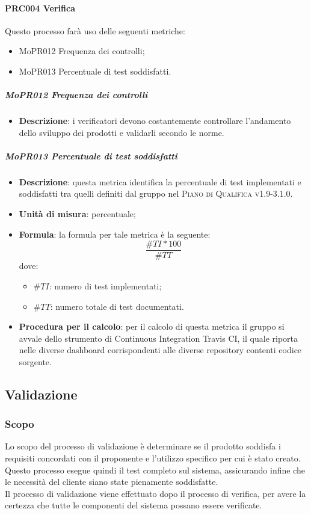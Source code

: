 \documentclass[../norme-di-progetto.tex]{subfiles}
\begin{document}
\paragraph{PRC004 Verifica}
Questo processo farà uso delle seguenti metriche:
\begin{itemize}
  \item MoPR012 Frequenza dei controlli;
  \item MoPR013 Percentuale di test soddisfatti.
\end{itemize}
\subparagraph{MoPR012 Frequenza dei controlli}
\begin{itemize}
  \item \textbf{Descrizione}: i verificatori devono costantemente controllare l'andamento dello sviluppo dei prodotti e validarli secondo le norme.
\end{itemize}

\subparagraph{MoPR013 Percentuale di test soddisfatti}
\begin{itemize}
  \item \textbf{Descrizione}: questa metrica identifica la percentuale di test implementati e soddisfatti tra quelli definiti dal gruppo nel \textsc{Piano di Qualifica v1.9-3.1.0}.
  \item \textbf{Unità di misura}: percentuale;
  \item \textbf{Formula}: la formula per tale metrica è la seguente:
  \begin{displaymath}
    \frac{\#TI * 100}{\#TT}
  \end{displaymath}
  dove:
  \begin{itemize}
    \item $ \#TI $: numero di test implementati;
    \item $ \#TT $: numero totale di test documentati.
  \end{itemize}
  \item \textbf{Procedura per il calcolo}: per il calcolo di questa metrica il gruppo si avvale dello strumento di Continuous Integration Travis CI, il quale riporta nelle diverse dashboard corrispondenti alle diverse repository contenti codice sorgente.
\end{itemize}

\subsection{Validazione}
\subsubsection{Scopo}
Lo scopo del processo di validazione è determinare se il prodotto soddisfa i requisiti concordati con il proponente e l'utilizzo specifico per cui è stato creato. Questo processo esegue quindi il test completo sul sistema, assicurando infine che le necessità del cliente siano state pienamente soddisfatte. \\ Il processo di validazione viene effettuato dopo il processo di verifica, per avere la certezza che tutte le componenti del sistema possano essere verificate.
\end{document}
